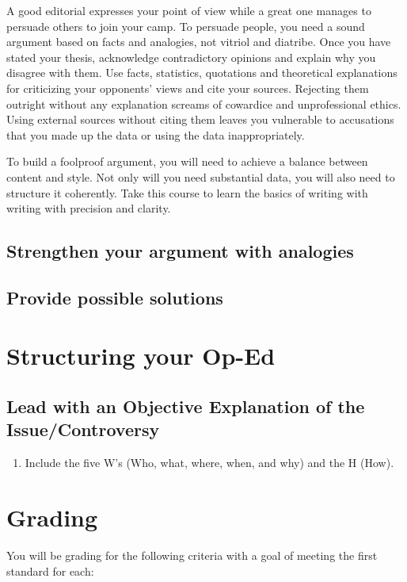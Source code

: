 \documentclass{tufte-handout}\usepackage[]{graphicx}\usepackage[]{color}
\begin{document}
A good editorial expresses your point of view while a great one manages to persuade others to join your camp. To persuade people, you need a sound argument based on facts and analogies, not vitriol and diatribe. Once you have stated your thesis, acknowledge contradictory opinions and explain why you disagree with them. Use facts, statistics, quotations and theoretical explanations for criticizing your opponents' views and cite your sources. Rejecting them outright without any explanation screams of cowardice and unprofessional ethics. Using external sources without citing them leaves you vulnerable to accusations that you made up the data or using the data inappropriately. 

To build a foolproof argument, you will need to achieve a balance between content and style. Not only will you need substantial data, you will also need to structure it coherently. Take this course to learn the basics of writing with writing with precision and clarity.


\subsection{Strengthen your argument with analogies}


\subsection{Provide possible solutions}


\section{Structuring your Op-Ed}

\subsection{Lead with an Objective Explanation of the Issue/Controversy}

\begin{enumerate}
	\item Include the five W's  (Who, what, where, when, and why) and the H (How). 
\end{enumerate}

\section{Grading}

You will be grading for the following criteria with a goal of meeting the first standard for each:
\end{document}
